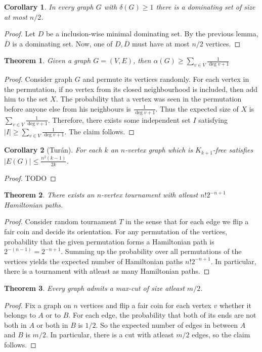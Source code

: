 \documentclass{article}
\theoremstyle{plain}
\newtheorem{thm}{Theorem}
\newtheorem{dus}{Corollary}
\theoremstyle{definition}
\begin{document}
\begin{dus}
	In every graph $G$ with $\delta(G)\geq 1$ there is a dominating set of size at most $n/2$.
\end{dus}
\begin{proof}
	Let $D$ be a inclusion-wise minimal dominating set. By the previous lemma, $\overline{D}$ is a dominating set. Now, one of $D,\overline{D}$ must have at most $n/2$ vertices.
\end{proof}

\begin{thm}\label{thm:is_rand}
	Given a graph $G=(V,E)$, then $\alpha(G)\geq \sum_{v\in V}\frac{1}{\deg v + 1}$
\end{thm}
\begin{proof}
	Consider graph $G$ and permute its vertices randomly. For each vertex in the permutation, if no vertex from its closed neighbourhood is included, then add him to the set $X$. The probability that a vertex was seen in the permutation before anyone else from his neighbours is $\frac{1}{\deg v + 1}$. Thus the expected size of $X$ is $\sum_{v\in V}\frac{1}{\deg v + 1}$. Therefore, there exists some independent set $I$ satisfying $|I|\geq \sum_{v\in V}\frac{1}{\deg v + 1}$. The claim follows.
\end{proof}


\begin{dus}[Turán]
	For each $k$ an $n$-vertex graph which is $K_{k+1}$-free satisfies $|E(G)|\leq \frac{n^2(k-1)}{2k}$.
\end{dus}
\begin{proof}
	TODO
\end{proof}

\begin{thm}
	There exists an $n$-vertex tournament with atleast $n!2^{-n+1}$ Hamiltonian paths.
\end{thm}
\begin{proof}
	Consider random tournament $T$ in the sense that for each edge we flip a fair coin and decide its orientation. For any permutation of the vertices, probability that the given permutation forms a Hamiltonian path is $2^{-(n-1)}=2^{-n+1}$. Summing up the probability over all permutations of the vertices yields the expected number of Hamiltonian paths $n!2^{-n+1}$. In particular, there is a tournament with atleast as many Hamiltonian paths.
\end{proof}


\begin{thm}\label{thm:maxcut_prob}
	Every graph admits a max-cut of size atleast $m/2$.
\end{thm}
\begin{proof}
	Fix a graph on $n$ vertices and flip a fair coin for each vertex $v$ whether it belongs to $A$ or to $B$. For each edge, the probability that both of its ends are not both in $A$ or both in $B$ is $1/2$. So the expected number of edges in between $A$ and $B$ is $m/2$. In particular, there is a cut with atleast $m/2$ edges, so the claim follows. 
\end{proof}
\end{document}
